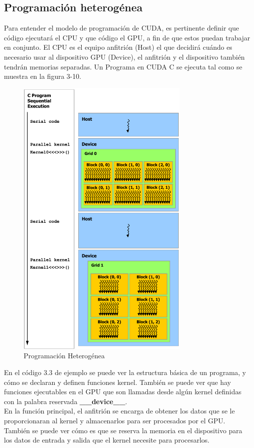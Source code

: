 \subsection{Programación heterogénea}
Para entender el modelo de programación de CUDA, es pertinente definir que código ejecutará el CPU y que código el GPU, a fin de que estos puedan trabajar en conjunto. El CPU es el equipo anfitrión (Host) el que decidirá cuándo es necesario usar al dispositivo GPU (Device), el anfitrión y el dispositivo también tendrán memorias separadas. Un Programa en CUDA C se ejecuta tal como se muestra en la figura 3-10.\\
\begin{figure}[H]
                      \centering
                              \includegraphics[height=14cm]{img/PH.png}
                      \caption{Programación Heterogénea \cite{Flops}}
\end{figure}
En el código 3.3 de ejemplo se puede ver la estructura básica de un programa, y cómo se declaran y definen funciones kernel. También se puede ver que hay funciones ejecutables en el GPU que son llamadas desde algún kernel definidas con la palabra reservada \textbf{\_\_device\_\_}.\\
En la función principal, el anfitrión se encarga de obtener los datos que se le proporcionaran al kernel y almacenarlos para ser procesados por el  GPU. También se puede ver cómo es que se reserva la memoria en el dispositivo para los datos de entrada y salida que el kernel necesite para procesarlos.\\
